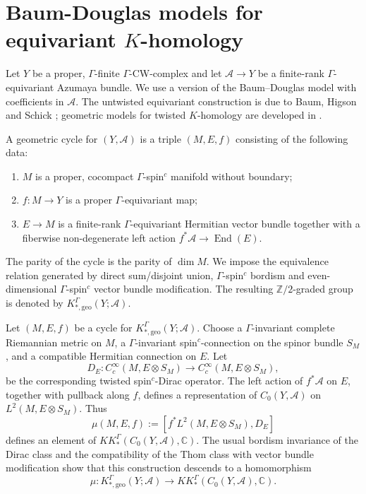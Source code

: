 \documentclass[a4paper,reqno]{amsart}
\numberwithin{equation}{section}
\def\dim{\operatorname{dim}}
\theoremstyle{definition}
\theoremstyle{remark}
\begin{document}
\section{Baum-Douglas models for equivariant $K$-homology}
\label{bdsecada}







Let $Y$ be a proper, $\Gamma$-finite $\Gamma$-CW-complex and let $\mathcal A\to Y$ be a finite-rank $\Gamma$-equivariant Azumaya bundle. We use a version of the Baum--Douglas model with coefficients in $\mathcal A$. The untwisted equivariant construction is due to Baum, Higson and Schick \cite{BaumHigsonSchick2010}; geometric models for twisted $K$-homology are developed in \cite{Barcenas2020,BaumCareyWang2013,DeeleyGoffeng2017}.

A geometric cycle for $(Y,\mathcal A)$ is a triple $(M,E,f)$ consisting of the following data:
\begin{enumerate}
\item $M$ is a proper, cocompact
$\Gamma$-spin$^{c}$ manifold without boundary;
\item $f:M\to Y$ is a proper $\Gamma$-equivariant map;
\item $E\to M$ is a finite-rank $\Gamma$-equivariant Hermitian
vector bundle together with a fiberwise non-degenerate left action $f^*\mathcal A\longrightarrow \operatorname{End}(E)$.
\end{enumerate}
The parity of the cycle is the parity of $\dim M$. We impose the equivalence relation generated by direct sum/disjoint union, $\Gamma$-spin$^{c}$ bordism and even-dimensional $\Gamma$-spin$^{c}$ vector bundle modification. The resulting $\mathbb Z/2$-graded group is denoted by $K^{\Gamma}_{*,\mathrm{geo}}(Y;\mathcal A)$.




Let $(M,E,f)$ be a cycle for $K^{\Gamma}_{*,\mathrm{geo}}(Y;\mathcal A)$. Choose a $\Gamma$-invariant complete Riemannian metric on $M$, a
$\Gamma$-invariant spin$^{c}$-connection on the spinor bundle $S_M$, and a compatible Hermitian connection on $E$. Let
\[D_E:C_c^\infty(M,E\otimes S_M) \longrightarrow C_c^\infty(M,E\otimes S_M),\]
be the corresponding twisted spin$^{c}$-Dirac operator. The left action of $f^*\mathcal A$ on $E$, together with pullback along $f$, defines a representation of $C_0(Y,\mathcal A)$ on $L^2(M,E\otimes S_M)$. Thus
\[\mu(M,E,f):=\left[f^*L^2(M,E\otimes S_M),D_E\right]\]
defines an element of $KK^\Gamma_*(C_0(Y,\mathcal A),\mathbb C)$. The usual bordism invariance of the Dirac class and the compatibility of the Thom class with vector bundle modification show that this construction descends to a homomorphism
\[\mu:K^{\Gamma}_{*,\mathrm{geo}}(Y;\mathcal A) \longrightarrow KK^\Gamma_*(C_0(Y,\mathcal A),\mathbb C).\]
\end{document}
